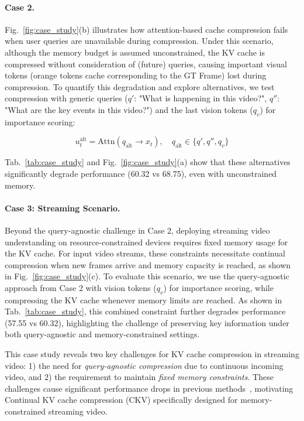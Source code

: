 \paragraph{Case 2.} Fig.~\ref{fig:case_study}(b) illustrates how attention-based cache compression fails when user queries are unavailable during compression.
Under this scenario, although the memory budget is assumed unconstrained, the KV cache is compressed without consideration of (future) queries, causing important visual tokens (orange tokens cache corresponding to the GT Frame) lost during compression.
To quantify this degradation and explore alternatives, we test compression with generic queries ($q'$: "What is happening in this video?", $q'':$"What are the key events in this video?") and the last vision tokens ($q_v$) for importance scoring:

\begin{equation}
u^{\text{alt}}_t = \text{Attn}(q_{\text{alt}} \rightarrow x_t), \quad 
q_{\text{alt}} \in \{q', q'', q_v\}
\label{eq:alternative-importance}
\end{equation}

Tab.~\ref{tab:case_study} and Fig.~\ref{fig:case_study}(a) show that these alternatives significantly degrade performance (60.32 vs 68.75), even with unconstrained memory.

\paragraph{Case 3: Streaming Scenario.} Beyond the query-agnostic challenge in Case 2, deploying streaming video understanding on resource-constrained devices requires fixed memory usage for the KV cache.
For input video streams, these constraints necessitate continual compression when new frames arrive and memory capacity is reached, as shown in Fig.~\ref{fig:case_study}(c).
To evaluate this scenario, we use the query-agnostic approach from Case 2 with vision tokens ($q_v$) for importance scoring, while compressing the KV cache whenever memory limits are reached.
As shown in Tab.~\ref{tab:case_study}, this combined constraint further degrades performance (57.55 vs 60.32), highlighting the challenge of preserving key information under both query-agnostic and memory-constrained settings.

This case study reveals two key challenges for KV cache compression in streaming video: 1) the need for \textit{query-agnostic compression} due to continuous incoming video, and 2) the requirement to maintain \textit{fixed memory constraints}. These challenges cause significant performance drops in previous methods~\cite{li2024snapkv,kim-etal-2024-infinipot,chen2024image}, motivating Continual KV cache compression (CKV) specifically designed for memory-constrained streaming video.


